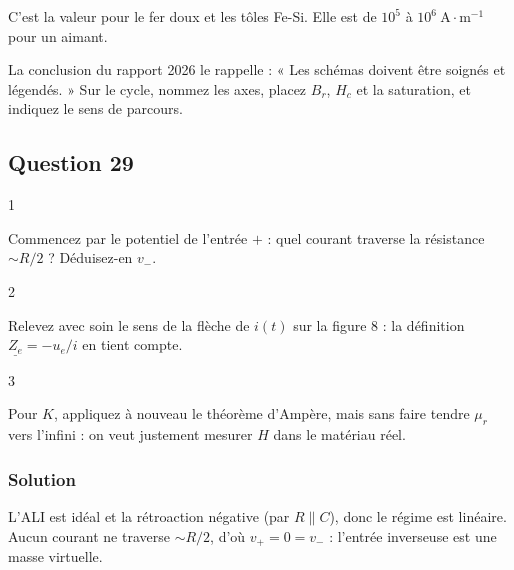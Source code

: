 \documentclass[11pt,a4paper]{article}
\newcommand{\equationajustee}[1]{%
  \sbox{\boiteequation}{$\displaystyle #1$}%
  \ifdim\wd\boiteequation>\linewidth
    \[\resizebox{\linewidth}{!}{\usebox{\boiteequation}}\]%
  \else
    \[#1\]%
  \fi}
\begin{document}
\equationajustee{\boxed{H_c\sim10\ \text{\text{à}}\ 10^2\ \mathrm{A\cdot m^{-1}}}}

C'est la valeur pour le fer doux et les tôles Fe-Si. Elle est de \(10^5\) à \(10^6\ \mathrm{A\cdot m^{-1}}\) pour un aimant.

\begin{jury}

La conclusion du rapport 2026 le rappelle : « Les schémas doivent être soignés et légendés. » Sur le cycle, nommez les axes, placez \(B_r\), \(H_c\) et la saturation, et indiquez le sens de parcours.

\end{jury}

\hypertarget{question-29}{%
\subsection{Question 29}\label{question-29}}

\begin{indication}{1}

Commencez par le potentiel de l'entrée \(+\) : quel courant traverse la résistance \(\sim R/2\) ? Déduisez-en \(v_-\).

\end{indication}

\begin{indication}{2}

Relevez avec soin le sens de la flèche de \(i(t)\) sur la figure 8 : la définition \(\underline{Z_e}=-u_e/i\) en tient compte.

\end{indication}

\begin{indication}{3}

Pour \(K\), appliquez à nouveau le théorème d'Ampère, mais sans faire tendre \(\mu_r\) vers l'infini : on veut justement mesurer \(H\) dans le matériau réel.

\end{indication}

\hypertarget{solution-28}{%
\subsubsection{Solution}\label{solution-28}}

L'ALI est idéal et la rétroaction négative (par \(R\parallel C\)), donc le régime est linéaire. Aucun courant ne traverse \(\sim R/2\), d'où \(v_+=0=v_-\) : l'entrée inverseuse est une masse virtuelle.
\end{document}

